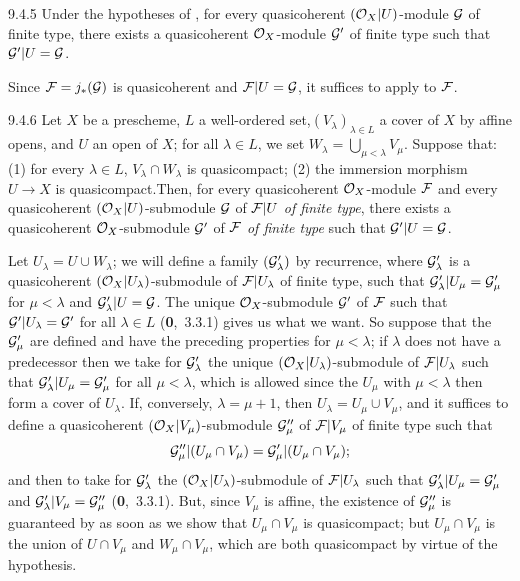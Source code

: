 \documentclass[../main.tex]{subfiles}
\begin{document}
\begin{env}[Corollary]{9.4.5}
Under the hypotheses of , for every quasicoherent $(\mathcal{O}_X|U)$-module
$\mathcal{G}$ of finite type, there exists a quasicoherent $\mathcal{O}_X$-module
$\mathcal{G}'$ of finite type such that $\mathcal{G}'|U=\mathcal{G}$.
\end{env}

Since $\mathcal{F}=j_\ast(\mathcal{G})$ is quasicoherent  and
$\mathcal{F}|U=\mathcal{G}$, it suffices to apply  to $\mathcal{F}$.

\begin{env}[Lemma]{9.4.6}
Let $X$ be a prescheme, $L$ a well-ordered set,$(V_\lambda)_{\lambda\in L}$ a cover
of $X$ by affine opens, and $U$ an open of
$X$; for all $\lambda\in L$, we set $W_\lambda=\bigcup_{\mu<\lambda}V_\mu$.
Suppose that: (1) for every $\lambda\in L$, $V_\lambda\cap W_\lambda$ is
quasicompact; (2) the immersion morphism $U\to X$ is quasicompact.Then, for
every quasicoherent $\mathcal{O}_X$-module $\mathcal{F}$ and every quasicoherent
$(\mathcal{O}_X|U)$-submodule $\mathcal{G}$ of $\mathcal{F}|U$ \emph{of finite type}, there
exists a quasicoherent $\mathcal{O}_X$-submodule $\mathcal{G}'$ of $\mathcal{F}$ \emph{of
finite type} such that $\mathcal{G}'|U=\mathcal{G}$.
\end{env}

Let $U_\lambda=U\cup W_\lambda$; we will define a family $(\mathcal{G}'_\lambda)$
by recurrence, where $\mathcal{G}'_\lambda$ is a quasicoherent
$(\mathcal{O}_X|U_\lambda)$-submodule of $\mathcal{F}|U_\lambda$ of finite type, such that
$\mathcal{G}'_\lambda|U_\mu=\mathcal{G}'_\mu$ for $\mu<\lambda$ and
$\mathcal{G}'_\lambda|U=\mathcal{G}$. The unique $\mathcal{O}_X$-submodule $\mathcal{G}'$ of
$\mathcal{F}$ such that $\mathcal{G}'|U_\lambda=\mathcal{G}'$ for all $\lambda\in L$
(\textbf{0},~3.3.1) gives us what we want. So suppose that the $\mathcal{G}'_\mu$
are defined and have the preceding properties for $\mu<\lambda$; if $\lambda$
does not have a predecessor then we take for $\mathcal{G}'_\lambda$ the unique
$(\mathcal{O}_X|U_\lambda)$-submodule of $\mathcal{F}|U_\lambda$ such that
$\mathcal{G}'_\lambda|U_\mu=\mathcal{G}'_\mu$ for all $\mu<\lambda$, which is
allowed since the $U_\mu$ with $\mu<\lambda$ then form a cover of $U_\lambda$.
If, conversely, $\lambda=\mu+1$, then $U_\lambda=U_\mu\cup V_\mu$, and it
suffices to define a quasicoherent $(\mathcal{O}_X|V_\mu)$-submodule $\mathcal{G}''_\mu$
of $\mathcal{F}|V_\mu$ of finite type such that
\[
  \mathcal{G}''_\mu|(U_\mu\cap V_\mu)=\mathcal{G}'_\mu|(U_\mu\cap V_\mu);
\]
and then to take for $\mathcal{G}'_\lambda$ the
$(\mathcal{O}_X|U_\lambda)$-submodule of $\mathcal{F}|U_\lambda$ such that
$\mathcal{G}'_\lambda|U_\mu=\mathcal{G}'_\mu$ and
$\mathcal{G}'_\lambda|V_\mu=\mathcal{G}''_\mu$ (\textbf{0},~3.3.1). But, since
$V_\mu$ is affine, the existence of $\mathcal{G}''_\mu$ is guaranteed by 
as soon as we show that $U_\mu\cap V_\mu$ is quasicompact; but $U_\mu\cap
V_\mu$ is the union of $U\cap V_\mu$ and $W_\mu\cap V_\mu$, which are both
quasicompact by virtue of the hypothesis.
\end{document}
